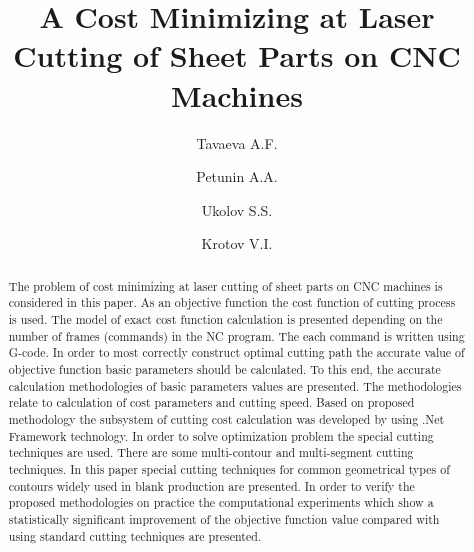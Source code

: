 \documentclass[runningheads]{llncs}
\begin{document}
\title{A Cost Minimizing at Laser Cutting of Sheet Parts on CNC Machines}

\author{
  Tavaeva A.F. 
  \and
  Petunin A.A.  
  \and
  Ukolov S.S.  
  \and Krotov V.I. 
}

\maketitle              %

\begin{abstract}
The problem of cost minimizing at laser cutting of sheet parts on CNC machines is considered
in this paper.
As an objective function the cost function of cutting process is used.
The model of exact cost function calculation is presented
depending on the number of frames (commands) in the NC program.
The each command is written using G-code.
In order to most correctly construct optimal cutting path
the accurate value of objective function basic parameters should be calculated.
To this end,
the accurate calculation methodologies of basic parameters values are presented.
The methodologies relate to calculation of cost parameters and cutting speed.
Based on proposed methodology the subsystem of cutting cost calculation was developed by
using .Net Framework technology.
In order to solve optimization problem
the special cutting techniques are used.
There are some multi-contour and multi-segment cutting techniques.
In this paper special cutting techniques
for common geometrical types of contours
widely used in blank production are presented.
In order to verify the proposed methodologies on practice
the computational experiments which show
a statistically significant improvement of the objective function value
compared with using standard cutting techniques are presented.

\end{abstract}
\end{document}
